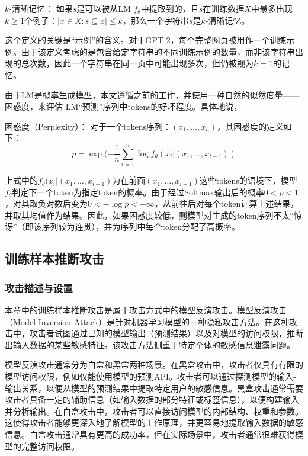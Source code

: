 \begin{definition}{$k$-清晰记忆：}
	\label{k_clear_mem}
	如果$s$是可以被从LM $f_θ$中提取到的，且$s$在训练数据$X$中最多出现$k\geq1$个例子：$|{x\in X: s⊆x}|\leq k$，那么一个字符串$s$是$k$-清晰记忆。
\end{definition}

这个定义的关键是“示例”的含义。对于GPT-2，每个完整网页被用作一个训练示例。由于该定义考虑的是包含给定字符串的不同训练示例的数量，而非该字符串出现的总次数，因此一个字符串在同一页中可能出现多次，但仍被视为$k=1$的记忆。

由于LM是概率生成模型，本文遵循之前的工作，并使用一种自然的似然度量——困惑度，来评估 LM“预测”序列中tokens的好坏程度。具体地说，

\begin{definition}{困惑度（Perplexity）：}
	对于一个tokens序列：$(x_1,\dots,x_n )$，其困惑度的定义如下：
	$$p=\exp(-\frac{1}{n}\sum_{i=1}^{n}\log f_\theta(x_i|(x_1,\dots,x_{i-1}))$$
	\label{PPL}
\end{definition}

上式中的$f_\theta(x_i|(x_1,\dots,x_{i-1})$为在前面$(x_1,\dots,x_{i-1})$这些tokens的语境下，模型$f_\theta$判定下一个token为指定token的概率。由于经过\rm{Softmax}输出后的概率$0<p<1$，对其取负对数后变为$0 < -\log p < +\infty$，从前往后对每个token计算上述结果，并取其均值作为结果。因此，如果困惑度较低，则模型对生成的token序列不太“惊讶”（即该序列较为连贯），并为序列中每个token分配了高概率。


\subsection{训练样本推断攻击} \label{训练样本推断攻击-实验设置}

\subsubsection{攻击描述与设置}

本章中的训练样本推断攻击是属于攻击方式中的模型反演攻击。模型反演攻击（Model Inversion Attack）是针对机器学习模型的一种隐私攻击方法。在这种攻击中，攻击者试图通过已知的模型输出（预测结果）以及对模型的访问权限，推断出输入数据的某些敏感特征。该攻击方法侧重于特定个体的敏感信息泄露问题。

模型反演攻击通常分为白盒和黑盒两种场景。在黑盒攻击中，攻击者仅具有有限的模型访问权限，例如仅能使用模型的预测API。攻击者可以通过探测模型的输入-输出关系，以便从模型的预测结果中提取特定用户的敏感信息。黑盒攻击通常需要攻击者具备一定的辅助信息（如输入数据的部分特征或标签信息），以便构建输入并分析输出。在白盒攻击中，攻击者可以直接访问模型的内部结构、权重和参数。这使得攻击者能够更深入地了解模型的工作原理，并更容易地提取输入数据的敏感信息。白盒攻击通常具有更高的成功率，但在实际场景中，攻击者通常很难获得模型的完整访问权限。

